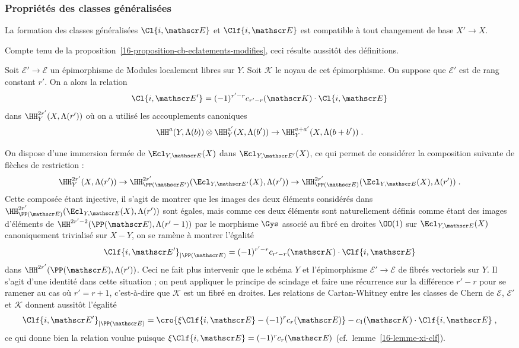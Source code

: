 \documentclass[10pt]{../fichiers-configuration-latex/smfart}
\begin{document}
\subsubsection{Propriétés des classes généralisées}%

\begin{proposition3}
\label{16-proposition-classes-generalisees-cb}
La formation des classes généralisées $\Cl{i,\mathscr E}$ 
et $\Clf {i,\mathscr E}$ est compatible à tout changement de base $X'\to X$.
\end{proposition3}

Compte tenu de la 
proposition~\ref{16-proposition-cb-eclatements-modifies}, ceci résulte
aussitôt des définitions.

\begin{proposition3}
\label{16-proposition-classes-generalisees-changement-de-fibre}
Soit ${\mathscr E}'\to {\mathscr E}$ un épimorphisme
de Modules localement libres sur $Y$. Soit $\mathscr K$ le noyau de cet
épimorphisme. On suppose que ${\mathscr E}'$ est de rang constant $r'$.
On a alors la relation
\[\Cl {i,\mathscr E'}= (-1)^{r'-r}c_{r'-r}({\mathscr K})\cdot\Cl
{i,\mathscr E}\]
dans $\HH^{2r'}_Y(X,\Lambda(r'))$ où on a utilisé les accouplements
canoniques \[\HH^a(Y,\Lambda(b))\otimes 
\HH^{a'}_Y(X,\Lambda(b'))\to  \HH^{a+a'}_Y(X,\Lambda(b+b'))\;\text{.}\]
\end{proposition3}

On dispose d'une immersion fermée de 
$\Ecl_{Y,\mathscr E}(X)$ dans 
$\Ecl_{Y,{\mathscr E}'}(X)$, ce qui permet de considérer la composition
suivante de flèches de restriction :
\[\HH^{2r'}_Y(X,\Lambda(r'))\to \HH^{2r'}_{\PP(\mathscr E')}(\Ecl_{Y,\mathscr
E'}(X),\Lambda(r'))\to \HH^{2r'}_{\PP(\mathscr E)}(\Ecl_{Y,\mathscr
E}(X),\Lambda(r'))\;\text{.}\]
Cette composée étant injective, il s'agit de montrer que les images des
deux éléments considérés dans $\HH^{2r'}_{\PP(\mathscr E)}(\Ecl_{Y,\mathscr
E}(X),\Lambda(r'))$
sont égales, mais comme ces deux éléments sont naturellement définis
comme étant des images d'éléments de $\HH^{2r'-2}(\PP(\mathscr
E),\Lambda(r'-1))$ par le morphisme $\Gys$ associé au fibré en droites
$\OO(1)$ sur $\Ecl_{Y,\mathscr E}(X)$ canoniquement trivialisé
sur $X-Y$, on se ramène à montrer l'égalité
\[{\Clf{i,{\mathscr E}'}}_{|\PP(\mathscr E)}=
(-1)^{r'-r}c_{r'-r}({\mathscr K})\cdot\Clf{i,\mathscr
E}\]
dans $\HH^{2r'}(\PP(\mathscr E),\Lambda(r'))$. Ceci ne fait plus intervenir
que le schéma $Y$ et l'épimorphisme ${\mathscr E}'\to \mathscr E$ de fibrés
vectoriels sur $Y$. Il s'agit d'une identité  dans cette
situation ; on peut appliquer le principe de scindage et faire une
récurrence sur la différence $r'-r$ pour se ramener au cas où $r'=r+1$,
c'est-à-dire que $\mathscr K$ est un fibré en droites.
Les relations de Cartan-Whitney entre les classes de Chern de
$\mathscr E$, ${\mathscr E}'$ et $\mathscr K$ donnent aussitôt l'égalité
\[{\Clf{i,\mathscr E'}}_{|\PP(\mathscr E)} = \cro{\xi \Clf{i,\mathscr
E}-(-1)^rc_r({\mathscr E})}-c_1(\mathscr K)\cdot\Clf{i,\mathscr E}\;\text{,}\]
ce qui donne bien la relation voulue puisque $\xi\Clf{i,\mathscr
E}=(-1)^rc_r({\mathscr E})$ (cf.~lemme~\ref{16-lemme-xi-clf}).
\end{document}
